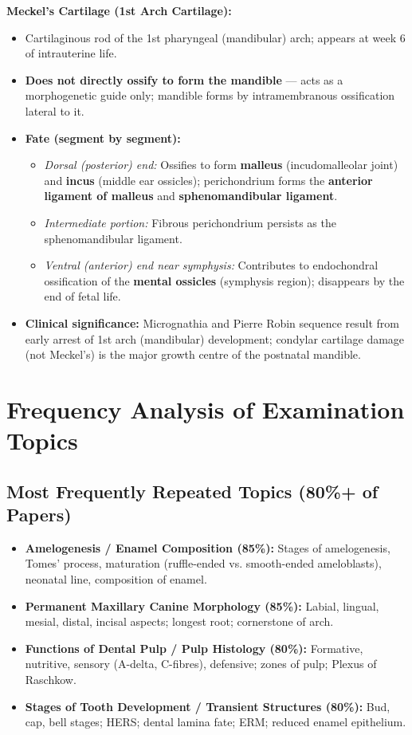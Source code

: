 \documentclass[11pt,a4paper]{article}
\begin{document}
\begin{ansbox}
\textbf{Meckel's Cartilage (1st Arch Cartilage):}
\begin{itemize}[leftmargin=*]
    \item Cartilaginous rod of the 1st pharyngeal (mandibular) arch; appears at week 6 of intrauterine life.
    \item \textbf{Does not directly ossify to form the mandible} --- acts as a morphogenetic guide only; mandible forms by intramembranous ossification lateral to it.
    \item \textbf{Fate (segment by segment):}
    \begin{itemize}
        \item \textit{Dorsal (posterior) end:} Ossifies to form \textbf{malleus} (incudomalleolar joint) and \textbf{incus} (middle ear ossicles); perichondrium forms the \textbf{anterior ligament of malleus} and \textbf{sphenomandibular ligament}.
        \item \textit{Intermediate portion:} Fibrous perichondrium persists as the sphenomandibular ligament.
        \item \textit{Ventral (anterior) end near symphysis:} Contributes to endochondral ossification of the \textbf{mental ossicles} (symphysis region); disappears by the end of fetal life.
    \end{itemize}
    \item \textbf{Clinical significance:} Micrognathia and Pierre Robin sequence result from early arrest of 1st arch (mandibular) development; condylar cartilage damage (not Meckel's) is the major growth centre of the postnatal mandible.
\end{itemize}
\end{ansbox}

\section{Frequency Analysis of Examination Topics}

\subsection{Most Frequently Repeated Topics (80\%+ of Papers)}
\begin{itemize}[leftmargin=*]
    \item \textbf{Amelogenesis / Enamel Composition (85\%):} Stages of amelogenesis, Tomes' process, maturation (ruffle-ended vs. smooth-ended ameloblasts), neonatal line, composition of enamel.
    \item \textbf{Permanent Maxillary Canine Morphology (85\%):} Labial, lingual, mesial, distal, incisal aspects; longest root; cornerstone of arch.
    \item \textbf{Functions of Dental Pulp / Pulp Histology (80\%):} Formative, nutritive, sensory (A-delta, C-fibres), defensive; zones of pulp; Plexus of Raschkow.
    \item \textbf{Stages of Tooth Development / Transient Structures (80\%):} Bud, cap, bell stages; HERS; dental lamina fate; ERM; reduced enamel epithelium.
\end{itemize}
\end{document}
